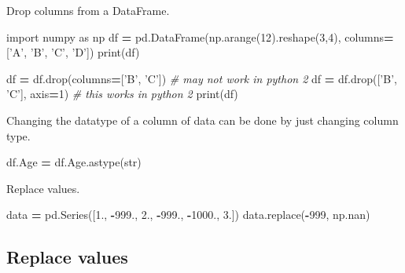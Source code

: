 \documentclass[]{book}
\newenvironment{Shaded}{\begin{snugshade}}{\end{snugshade}}
\newcommand{\DecValTok}[1]{\textcolor[rgb]{0.00,0.00,0.81}{#1}}
\newcommand{\StringTok}[1]{\textcolor[rgb]{0.31,0.60,0.02}{#1}}
\newcommand{\ImportTok}[1]{#1}
\newcommand{\CommentTok}[1]{\textcolor[rgb]{0.56,0.35,0.01}{\textit{#1}}}
\newcommand{\OperatorTok}[1]{\textcolor[rgb]{0.81,0.36,0.00}{\textbf{#1}}}
\newcommand{\BuiltInTok}[1]{#1}
\newcommand{\NormalTok}[1]{#1}
\begin{document}
Drop columns from a DataFrame.

\begin{Shaded}
\begin{Highlighting}[]
\ImportTok{import}\NormalTok{ numpy }\ImportTok{as}\NormalTok{ np}
\NormalTok{df }\OperatorTok{=}\NormalTok{ pd.DataFrame(np.arange(}\DecValTok{12}\NormalTok{).reshape(}\DecValTok{3}\NormalTok{,}\DecValTok{4}\NormalTok{),}
\NormalTok{                    columns}\OperatorTok{=}\NormalTok{[}\StringTok{'A'}\NormalTok{, }\StringTok{'B'}\NormalTok{, }\StringTok{'C'}\NormalTok{, }\StringTok{'D'}\NormalTok{])}
\BuiltInTok{print}\NormalTok{(df)}

\NormalTok{df }\OperatorTok{=}\NormalTok{ df.drop(columns}\OperatorTok{=}\NormalTok{[}\StringTok{'B'}\NormalTok{, }\StringTok{'C'}\NormalTok{]) }\CommentTok{# may not work in python 2}
\NormalTok{df }\OperatorTok{=}\NormalTok{ df.drop([}\StringTok{'B'}\NormalTok{, }\StringTok{'C'}\NormalTok{], axis}\OperatorTok{=}\DecValTok{1}\NormalTok{) }\CommentTok{# this works in python 2}
\BuiltInTok{print}\NormalTok{(df)}
\end{Highlighting}
\end{Shaded}

Changing the datatype of a column of data can be done by just changing
column type.

\begin{Shaded}
\begin{Highlighting}[]
\NormalTok{df.Age }\OperatorTok{=}\NormalTok{ df.Age.astype(}\BuiltInTok{str}\NormalTok{)}
\end{Highlighting}
\end{Shaded}

Replace values.

\begin{Shaded}
\begin{Highlighting}[]
\NormalTok{data }\OperatorTok{=}\NormalTok{ pd.Series([}\DecValTok{1}\NormalTok{., }\OperatorTok{-}\DecValTok{999}\NormalTok{., }\DecValTok{2}\NormalTok{., }\OperatorTok{-}\DecValTok{999}\NormalTok{., }\OperatorTok{-}\DecValTok{1000}\NormalTok{., }\DecValTok{3}\NormalTok{.])}
\NormalTok{data.replace(}\OperatorTok{-}\DecValTok{999}\NormalTok{, np.nan)}
\end{Highlighting}
\end{Shaded}

\subsection{Replace values}\label{replace-values}
\end{document}
